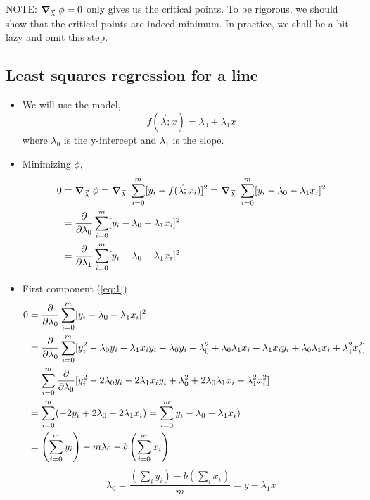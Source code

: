 \documentclass[12pt]{article}
\numberwithin{equation}{section}
\begin{document}
\begin{itemize}
NOTE: $ \grad_{\vec{\lambda}}\  \phi = 0 $ only gives us the critical points. To be rigorous, we should show that the critical points are indeed minimum. In practice, we shall be a bit lazy and omit this step.

\end{itemize}

\subsection{Least squares regression for a line}
\begin{itemize}
\item We will use the model,
\begin{equation}
		f(\vec{\lambda}; x) = \lambda_0 + \lambda_1 x
\end{equation}
where $ \lambda_0 $ is the y-intercept and $ \lambda_1 $ is the slope.
\item Minimizing $ \phi $,
\begin{align}
	0 &= \grad_{\vec{\lambda}}\  \phi  = \grad_{\vec{\lambda}}\  \sum_{i=0}^m [y_i - f(\vec{\lambda};x_i)]^2 = \grad_{\vec{\lambda}}\  \sum_{i=0}^m [y_i - \lambda_0 - \lambda_1 x_i]^2\\
	&= \pdv{}{\lambda_0} \sum_{i=0}^m [y_i - \lambda_0 - \lambda_1 x_i]^2 \label{eq:1}\\
	&= \pdv{}{\lambda_1} \sum_{i=0}^m [y_i - \lambda_0 - \lambda_1 x_i]^2 \label{eq:2}
\end{align}

\item First component (\ref{eq:1})
\begin{align*}
	0 &= \pdv{}{\lambda_0} \sum_{i=0}^m [y_i - \lambda_0 - \lambda_1 x_i]^2 \\
	&= \pdv{}{\lambda_0} \sum_{i=0}^m [y_i^2 - \lambda_0 y_i - \lambda_1x_iy_i - \lambda_0y_i + \lambda_0^2 + \lambda_0\lambda_1x_i - \lambda_1x_iy_i + \lambda_0\lambda_1x_i + \lambda_1^2x_i^2]\\
	&=  \sum_{i=0}^m \pdv{}{\lambda_0} [y_i^2 - 2\lambda_0y_i - 2\lambda_1x_iy_i + \lambda_0^2 + 2\lambda_0\lambda_1x_i + \lambda_1^2x_i^2]\\
	&=  \sum_{i=0}^m (-2y_i + 2\lambda_0 + 2\lambda_1x_i)=  \sum_{i=0}^m y_i - \lambda_0 - \lambda_1x_i)\\
	&=\left(\sum_{i=0}^m y_i\right) - m\lambda_0 - b\left(\sum_{i=0}^m x_i\right) \\
\end{align*}
\begin{equation}
			\lambda_0 = \frac{\left(\sum_i y_i\right) - b\left(\sum_i x_i\right)}{m} = \bar{y} - \lambda_1\bar{x}
\end{equation}


\end{itemize}
\end{document}
